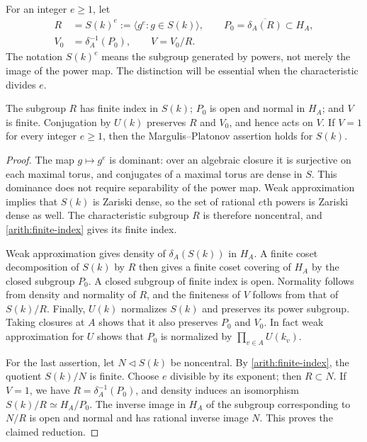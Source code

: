 For an integer $e\geq1$, let
\begin{equation}\label{arith:power-notation}
 \begin{split}
 R&=S(k)^e:=\langle g^e:g\in S(k)\rangle,\qquad
 P_0=\overline{\delta_A(R)}\subset H_A,\\
 V_0&=\delta_A^{-1}(P_0),\qquad V=V_0/R.
 \end{split}
\end{equation}
The notation $S(k)^e$ means the subgroup generated by powers, not merely
the image of the power map.  The distinction will be essential when the
characteristic divides $e$.

\begin{proposition}\label{arith:power-defect}
The subgroup $R$ has finite index in $S(k)$; $P_0$ is open and normal in
$H_A$; and $V$ is finite.  Conjugation by $U(k)$ preserves $R$ and $V_0$,
and hence acts on $V$.  If $V=1$ for every integer $e\geq1$, then the
Margulis--Platonov assertion holds for $S(k)$.
\end{proposition}

\begin{proof}
The map $g\mapsto g^e$ is dominant: over an algebraic closure it is
surjective on each maximal torus, and conjugates of a maximal torus are
dense in $S$.  This dominance does not require separability of the power
map.  Weak approximation implies that $S(k)$ is Zariski dense, so the
set of rational $e$th powers is Zariski dense as well.  The characteristic
subgroup $R$ is therefore noncentral, and
\cref{arith:finite-index} gives its finite index.

Weak approximation gives density of $\delta_A(S(k))$ in $H_A$.  A finite
coset decomposition of $S(k)$ by $R$ then gives a finite coset covering
of $H_A$ by the closed subgroup $P_0$.  A closed subgroup of finite index
is open.  Normality follows from density and normality of $R$, and the
finiteness of $V$ follows from that of $S(k)/R$.
Finally, $U(k)$ normalizes $S(k)$ and preserves its power subgroup.
Taking closures at $A$ shows that it also preserves $P_0$ and $V_0$.
In fact weak approximation for $U$ shows that $P_0$ is normalized by
$\prod_{v\in A}U(k_v)$.

For the last assertion, let $N\triangleleft S(k)$ be noncentral.
By \cref{arith:finite-index}, the quotient $S(k)/N$ is finite.
Choose $e$ divisible by its exponent; then $R\subset N$.
If $V=1$, we have $R=\delta_A^{-1}(P_0)$, and density induces an
isomorphism $S(k)/R\simeq H_A/P_0$.  The inverse image in $H_A$ of
the subgroup corresponding to $N/R$ is open and normal and has rational
inverse image $N$.  This proves the claimed reduction.
\end{proof}

